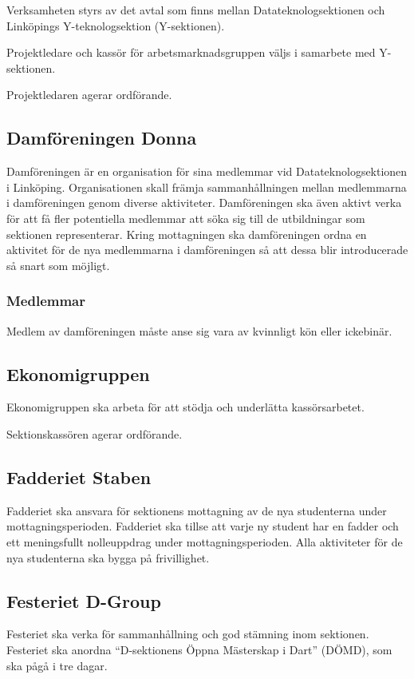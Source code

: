 \documentclass{datateknologsektionen-document}
\begin{document}
Verksamheten styrs av det avtal som finns mellan Datateknologsektionen och Linköpings
Y-teknologsektion (Y-sektionen).

Projektledare och kassör för arbetsmarknadsgruppen väljs i samarbete med Y-sektionen.

Projektledaren agerar ordförande.

\subsection{Damföreningen Donna}
Damföreningen är en organisation för sina medlemmar vid Datateknologsektionen i Linköping.
Organisationen skall främja sammanhållningen mellan medlemmarna i damföreningen genom
diverse aktiviteter. Damföreningen ska även aktivt verka för att få fler potentiella
medlemmar att söka sig till de utbildningar som sektionen representerar. Kring
mottagningen ska damföreningen ordna en aktivitet för de nya medlemmarna i damföreningen
så att dessa blir introducerade så snart som möjligt.

\subsubsection{Medlemmar}
Medlem av damföreningen måste anse sig vara av kvinnligt kön eller ickebinär.

\subsection{Ekonomigruppen}
Ekonomigruppen ska arbeta för att stödja och underlätta kassörsarbetet.

Sektionskassören agerar ordförande.

\subsection{Fadderiet Staben}
Fadderiet ska ansvara för sektionens mottagning av de nya studenterna under mottagningsperioden.
Fadderiet ska tillse att varje ny student har en fadder och ett meningsfullt nolleuppdrag
under mottagningsperioden. Alla aktiviteter för de nya studenterna ska bygga på frivillighet.

\subsection{Festeriet D-Group}
Festeriet ska verka för sammanhållning och god stämning inom sektionen. Festeriet ska
anordna ``D-sektionens Öppna Mästerskap i Dart'' (DÖMD), som ska pågå i tre dagar.
\end{document}
